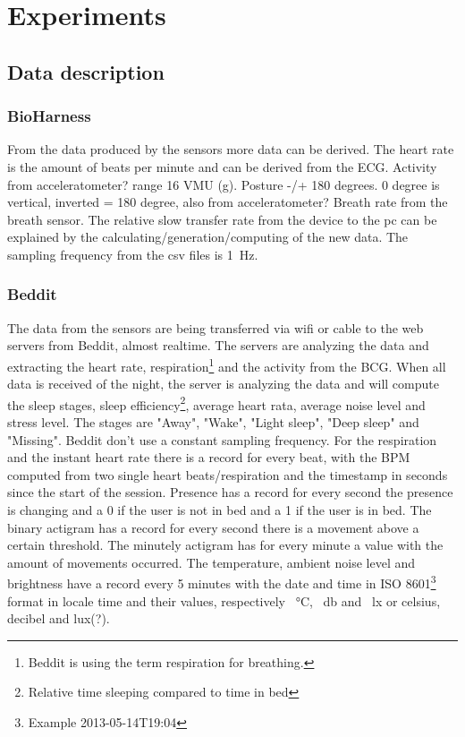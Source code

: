 \section{Experiments}
	\subsection{Data description}
		\subsubsection{BioHarness}
			From the data produced by the sensors more data can be derived. The heart rate is the amount of beats per minute and can be derived from the ECG.  
			Activity from acceleratometer? range 16 VMU (g).
			Posture -/+ 180 degrees. 0 degree is vertical, inverted = 180 degree, also from acceleratometer?
			Breath rate from the breath sensor. 
			The relative slow transfer rate from the device to the pc can be explained by the calculating/generation/computing of the new data.
			The sampling frequency from the csv files is \SI{1}{\hertz}.
		\subsubsection{Beddit}
		\label{sec:datadescriptionbeddit}
			The data from the sensors are being transferred via wifi or cable to the web servers from Beddit, almost realtime. The servers are analyzing the data and extracting the heart rate, respiration\footnote{Beddit is using the term respiration for breathing.} and the activity from the BCG. When all data is received of the night, the server is analyzing the data and will compute the sleep stages, sleep efficiency\footnote{Relative time sleeping compared to time in bed}, average heart rata, average noise level and stress level. The stages are "Away", "Wake", "Light sleep", "Deep sleep" and "Missing". Beddit don't use a constant sampling frequency. For the respiration and the instant heart rate there is a record for every beat, with the BPM computed from two single heart beats/respiration and the timestamp in seconds since the start of the session. Presence has a record for every second the presence is changing and a 0 if the user is not in bed and a 1 if the user is in bed. The binary actigram has a record for every second there is a movement above a certain threshold. The minutely actigram has for every minute a value with the amount of movements occurred. The temperature, ambient noise level and brightness have a record every 5 minutes with the date and time in ISO 8601\footnote{Example 2013-05-14T19:04\cite{iso8601}} format in locale time and their values, respectively \SI{}{\celsius}, \SI{}{\decibel} and \SI{}{\lux} or celsius, decibel and lux(?).

